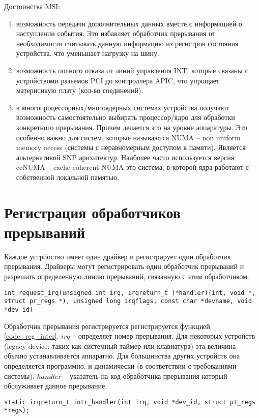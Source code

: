 Достоинства MSI:
\begin{enumerate}
	\item возможность передачи дополнительных данных вместе с информацией о наступлении события. Это избавляет обработчик прерывания от необходимости считывать данную информацию из регистров состояния устройства, что уменьшает нагрузку на шину.
	\item возможность полного отказа от линий управления INT, которые связаны с устройствоми разьемов  PCI до контроллера APIC, что упрощает материснкую плату (кол-во соединений).
	\item в многопроцессорных/многоядерных системах устройства получают возможность самостоятельно выбирать процессор/ядро для обработки конкретного прерывания. Причем делается это на уровне аппаратуры. Это особенно важно для систем, которые называются NUMA – non uniform memory access (системы с неравномерным доступом к памяти). Является альтернативой SNP арихитектур. Наиболее часто используется версия ccNUMA – cache coherent NUMA это система, в которой ядра работают с собственной локальной памятью.
\end{enumerate}	

\section{Регистрация обработчиков прерываний}

Каждое устрйоство имеет один драйвер и регистрирует один обработчик прерывания. Драйверы могут регистрировать один обработчик прерываний и разрешать определенную линию прерываний, связанную с этим обработчиком. 

\begin{lstlisting}[caption=listing, label=code_reg_inter]
int request_irq(unsigned int irq, irqreturn_t (*handler)(int, void *, struct pr_regs *), unsigned long irqflags, const char *devname, void *dev_id) 
\end{lstlisting}

Обработчик прерывания регистрируется регистрируется функцией \ref{code_reg_inter}.
$irq$ – определяет номер прерывания. Для некоторых устройств (legacy device: таких как системный таймер или клавиатура) эта величина обычно устанавливается аппаратно. Для большинства других устройств она определяется программно, и динамически (в соответствии с требованиями системы). 
$handler$ – указатель на код обработчика прерывания который обслуживает данное прерывание.

\begin{lstlisting}[caption=listing, label=code_work_inter]
static irqreturn_t intr_handler(int irq, void *dev_id, struct pt_regs *regs);
\end{lstlisting}

